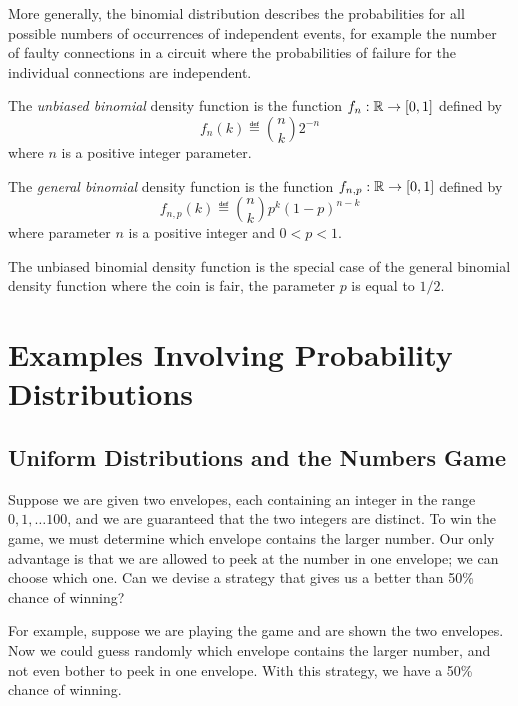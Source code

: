 \documentclass[11pt,twoside]{article}
\begin{document}
More generally, the binomial distribution describes the probabilities for
all possible numbers of occurrences of independent events, for example the
number of faulty connections in a circuit where the probabilities of
failure for the individual connections are independent.

\begin{definition}
The \emph{unbiased binomial} density function is the function $f_n: \mathbb{R}
\to [0, 1]$ defined by
\[
f_n(k) \eqdef \binom{n}{k} 2^{-n}
\]
where $n$ is a positive integer parameter.

The \emph{general binomial} density function is the function $f_{n,p}:
\mathbb{R} \to [0, 1]$ defined by
\[
f_{n,p}(k) \eqdef \binom{n}{k} p^k (1-p)^{n-k}
\]
where parameter $n$ is a positive integer and $0 < p < 1$.
\end{definition}

The unbiased binomial density function is the special case of the general
binomial density function where the coin is fair, \viz the parameter $p$
is equal to $1/2$.

\section{Examples Involving Probability Distributions}

\subsection{Uniform Distributions and the Numbers Game}


Suppose we are given two envelopes, each containing an integer in the
range $0, 1, \ldots 100$, and we are guaranteed that the two integers are
distinct.  To win the game, we must determine which envelope contains the
larger number.  Our only advantage is that we are allowed to peek at the
number in one envelope; we can choose which one.  Can we devise a strategy
that gives us a better than 50\% chance of winning?

For example, suppose we are playing the game and are shown the two
envelopes.  Now we could guess randomly which envelope contains the
larger number, and not even bother to peek in one envelope.  With this
strategy, we have a 50\% chance of winning.
\end{document}
